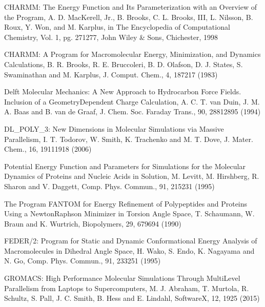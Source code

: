 \documentclass[letterpaper,11pt,english]{sphinxmanual}
\begin{document}
\sphinxAtStartPar
CHARMM: The Energy Function and Its Parameterization with an Overview of the Program, A. D. MacKerell, Jr., B. Brooks, C. L. Brooks, III, L. Nilsson, B. Roux, Y. Won, and M. Karplus, in The Encyclopedia of Computational Chemistry, Vol. 1, pg. 271\sphinxhyphen{}277, John Wiley \& Sons, Chichester, 1998

\sphinxAtStartPar
CHARMM: A Program for Macromolecular Energy, Minimization, and Dynamics Calculations, B. R. Brooks, R. E. Bruccoleri, B. D. Olafson, D. J. States, S. Swaminathan and M. Karplus, J. Comput. Chem., 4, 187\sphinxhyphen{}217 (1983)

\sphinxAtStartPar
{}

\sphinxAtStartPar
Delft Molecular Mechanics: A New Approach to Hydrocarbon Force Fields. Inclusion of a Geometry\sphinxhyphen{}Dependent Charge Calculation, A. C. T. van Duin, J. M. A. Baas  and B. van de Graaf, J. Chem. Soc. Faraday Trans., 90, 2881\sphinxhyphen{}2895 (1994)

\sphinxAtStartPar
{}

\sphinxAtStartPar
DL\_POLY\_3: New Dimensions in Molecular Simulations via Massive Parallelism, I. T. Todorov, W. Smith, K. Trachenko and M. T. Dove, J. Mater. Chem., 16, 1911\sphinxhyphen{}1918 (2006)

\sphinxAtStartPar
{}

\sphinxAtStartPar
Potential Energy Function and Parameters for Simulations for the Molecular Dynamics of Proteins and Nucleic Acids in Solution, M. Levitt, M. Hirshberg, R. Sharon and V. Daggett, Comp. Phys. Commun., 91, 215\sphinxhyphen{}231 (1995)

\sphinxAtStartPar
{}

\sphinxAtStartPar
The Program FANTOM for Energy Refinement of Polypeptides and Proteins Using a Newton\sphinxhyphen{}Raphson Minimizer in Torsion Angle Space, T. Schaumann, W. Braun and K. Wurtrich, Biopolymers, 29, 679\sphinxhyphen{}694 (1990)

\sphinxAtStartPar
{}

\sphinxAtStartPar
FEDER/2: Program for Static and Dynamic Conformational Energy Analysis of Macro\sphinxhyphen{}molecules in Dihedral Angle Space, H. Wako, S. Endo, K. Nagayama and N. Go, Comp. Phys. Commun., 91, 233\sphinxhyphen{}251 (1995)

\sphinxAtStartPar
{}

\sphinxAtStartPar
GROMACS: High Performance Molecular Simulations Through Multi\sphinxhyphen{}Level Parallelism from Laptops to Supercomputers, M. J. Abraham, T. Murtola, R. Schultz, S. Pall, J. C. Smith, B. Hess and E. Lindahl, SoftwareX, 1\sphinxhyphen{}2, 19\sphinxhyphen{}25 (2015)
\end{document}
